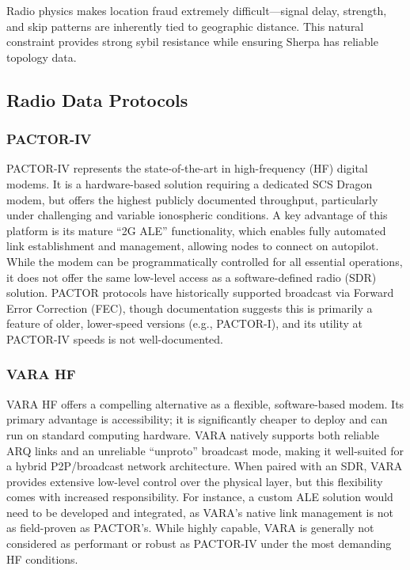 \documentclass{article}
\begin{document}
Radio physics makes location fraud extremely difficult—signal delay, strength, and skip patterns are inherently tied to geographic distance. This natural constraint provides strong sybil resistance while ensuring Sherpa has reliable topology data.

\subsection{Radio Data Protocols}

\subsubsection{PACTOR-IV}

PACTOR-IV represents the state-of-the-art in high-frequency (HF) digital modems. It is a hardware-based solution requiring a dedicated SCS Dragon modem, but offers the highest publicly documented throughput, particularly under challenging and variable ionospheric conditions. A key advantage of this platform is its mature ``2G ALE'' functionality, which enables fully automated link establishment and management, allowing nodes to connect on autopilot. While the modem can be programmatically controlled for all essential operations, it does not offer the same low-level access as a software-defined radio (SDR) solution. PACTOR protocols have historically supported broadcast via Forward Error Correction (FEC), though documentation suggests this is primarily a feature of older, lower-speed versions (e.g., PACTOR-I), and its utility at PACTOR-IV speeds is not well-documented.

\subsubsection{VARA HF}

VARA HF offers a compelling alternative as a flexible, software-based modem. Its primary advantage is accessibility; it is significantly cheaper to deploy and can run on standard computing hardware. VARA natively supports both reliable ARQ links and an unreliable ``unproto'' broadcast mode, making it well-suited for a hybrid P2P/broadcast network architecture. When paired with an SDR, VARA provides extensive low-level control over the physical layer, but this flexibility comes with increased responsibility. For instance, a custom ALE solution would need to be developed and integrated, as VARA's native link management is not as field-proven as PACTOR's. While highly capable, VARA is generally not considered as performant or robust as PACTOR-IV under the most demanding HF conditions.
\end{document}
